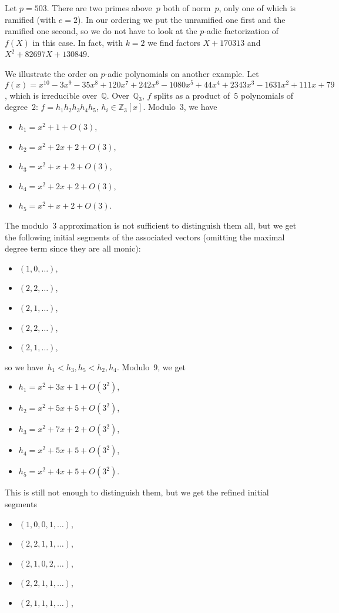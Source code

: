 \documentclass{article}
\def\Z{{\mathbb Z}}
\def\Q{{\mathbb Q}}
\begin{document}
Let $p=503$.  There are two primes above~$p$ both of norm~$p$, only
one of which is ramified (with $e=2$).  In our ordering we put the
unramified one first and the ramified one second, so we do not have to
look at the $p$-adic factorization of $f(X)$ in this case.  In fact,
with $k=2$ we find factors $X+170313$ and $X^2+82697X+130849$.

We illustrate the order on $p$-adic polynomials on another example. Let~$f(x) =
x^{10} - 3x^9 - 35x^8 + 120x^7 + 242x^6 - 1080x^5 + 44x^4 + 2343x^3 -
1631x^2 + 111x + 79$, which is irreducible over~$\Q$. Over~$\Q_3$, $f$ splits as
a product of~$5$ polynomials of degree~$2$: $f = h_1h_2h_3h_4h_5$,
$h_i\in\Z_3[x]$. Modulo~$3$, we have
\begin{itemize}
  \item $h_1 = x^2 + 1 +O(3)$,
  \item $h_2 = x^2 + 2x + 2 + O(3)$,
  \item $h_3 = x^2 + x + 2 + O(3)$,
  \item $h_4 = x^2 + 2x + 2 + O(3)$,
  \item $h_5 = x^2 + x + 2 + O(3)$.
\end{itemize}
The modulo~$3$ approximation is not sufficient to distinguish them all,
but we get the following initial segments of the associated vectors (omitting
the maximal degree term since they are all monic):
\begin{itemize}
  \item $(1,0,\dots)$,
  \item $(2,2,\dots)$,
  \item $(2,1,\dots)$,
  \item $(2,2,\dots)$,
  \item $(2,1,\dots)$,
\end{itemize}
so we have~$h_1 < h_3,h_5 < h_2,h_4$. Modulo~$9$, we get
\begin{itemize}
  \item $h_1 = x^2 + 3x + 1 + O(3^2)$,
  \item $h_2 = x^2 + 5x + 5 + O(3^2)$,
  \item $h_3 = x^2 + 7x + 2 + O(3^2)$,
  \item $h_4 = x^2 + 5x + 5 + O(3^2)$,
  \item $h_5 = x^2 + 4x + 5 + O(3^2)$.
\end{itemize}
This is still not enough to distinguish them, but
we get the refined initial segments
\begin{itemize}
  \item $(1,0,0,1,\dots)$,
  \item $(2,2,1,1,\dots)$,
  \item $(2,1,0,2,\dots)$,
  \item $(2,2,1,1,\dots)$,
  \item $(2,1,1,1,\dots)$,
\end{itemize}
\end{document}
